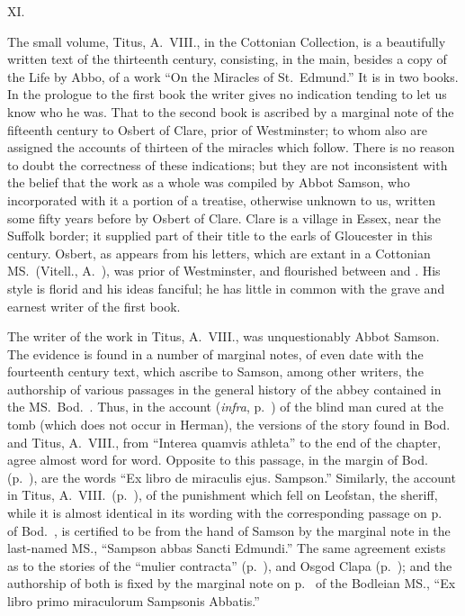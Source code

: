 \documentclass[10pt]{book}
\begin{document}
{\vspace{.3cm}
\begin{center}
XI.
\end{center}
\noindent The small volume, Titus, A.\ VIII., in the Cottonian Collection, is a beautifully written text of the thirteenth century, consisting, in the main, besides a copy of the Life by Abbo, of a work ``On the Miracles of St.\ Edmund.'' It is in two books. In the prologue to the first book the writer gives no indication tending to let us know who he was. That to the second book is ascribed by a marginal note of the fifteenth century to Osbert of Clare, prior of Westminster; to whom also are assigned the accounts of thirteen of the miracles which follow. There is no reason to doubt the correctness of these indications; but they are not inconsistent with the belief that the work as a whole was compiled by Abbot Samson, who incorporated with it a portion of a treatise, otherwise unknown to us, written some fifty years before by Osbert of Clare. Clare is a village in Essex, near the Suffolk border; it supplied part of their title to the earls of Gloucester in this century. Osbert, as appears from his letters, which are extant in a Cottonian MS.\ (Vitell., A.\ ), was prior of Westminster, and flourished between  and . His style is florid and his ideas fanciful; he has little in common with the grave and earnest writer of the first book.

The writer of the work in Titus, A.\ VIII., was unquestionably Abbot Samson. The evidence is found in a number of marginal notes, of even date with the fourteenth century text, which ascribe to Samson, among other writers, the authorship of various passages in the general history of the abbey contained in the MS.\ Bod.\ . Thus, in the account (\emph{infra}, p.\ ) of the blind man cured at the tomb (which does not occur in Herman), the versions of the story found in Bod.\  and Titus, A.\ VIII., from ``Interea quamvis athleta'' to the end of the chapter, agree almost word for word. Opposite to this passage, in the margin of Bod.\  (p.\ ), are the words ``Ex libro de miraculis ejus. Sampson.'' Similarly, the account in Titus, A.\ VIII.\ (p.\ ), of the punishment which fell on Leofstan, the sheriff, while it is almost identical in its wording with the corresponding passage on p.\  of Bod.\ , is certified to be from the hand of Samson by the marginal note in the last-named MS., ``Sampson abbas Sancti Edmundi.'' The same agreement exists as to the stories of the ``mulier contracta'' (p.\ ), and Osgod Clapa (p.\ ); and the authorship of both is fixed by the marginal note on p.\  of the Bodleian MS., ``Ex libro primo miraculorum Sampsonis Abbatis.''

}
\end{document}
